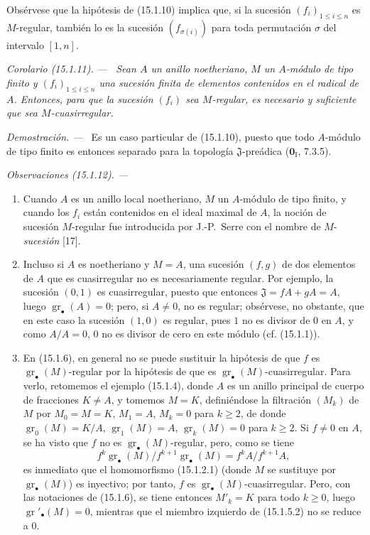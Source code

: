 \documentclass[10pt,oneside]{book}
\makeatletter
\newcommand{\gr}{\operatorname{gr}}
\newcommand{\setmanualcurrentlabel}[1]{\def\@currentlabel{#1}}
\newcommand{\oldpage}[2][]{%
  \setcounter{footnote}{0}%
  \marginpar{\scriptsize\textbf{#1}~|~#2}\ignorespaces}
\newenvironment{corollary}[1][]{%
  \setmanualcurrentlabel{#1}\par\medskip\noindent\itshape Corolario (#1). ---\ }{\par}
\newenvironment{remarks}[1][]{%
  \setmanualcurrentlabel{#1}\par\medskip\noindent\itshape Observaciones (#1). ---\ }{\par}
\newenvironment{proof}{%
  \par\medskip\noindent\textit{Demostración. ---\ }}{\par}
\makeatother
\begin{document}
Obsérvese que la hipótesis de (15.1.10) implica que, si la sucesión
$(f_i)_{1\leq i\leq n}$ es $M$-regular, también lo es la sucesión
$(f_{\sigma(i)})$ para toda permutación $\sigma$ del intervalo $[1,n]$.

\begin{corollary}[15.1.11]
\label{0.15.1.11-es}
Sean $A$ un anillo noetheriano, $M$ un $A$-módulo de tipo finito y
$(f_i)_{1\leq i\leq n}$ una sucesión finita de elementos contenidos en el
\textup{radical} de $A$. Entonces, para que la sucesión $(f_i)$ sea $M$-regular, es
necesario y suficiente que sea $M$-cuasirregular.
\end{corollary}

\begin{proof}
Es un caso particular de (15.1.10), puesto que todo $A$-módulo de tipo finito
es entonces separado para la topología $\mathfrak{J}$-preádica
($\mathbf{0}_{\mathrm I}$, 7.3.5).
\end{proof}

\begin{remarks}[15.1.12]
\label{0.15.1.12-es}
\mbox{}
\begin{enumerate}
  \item[(i)] Cuando $A$ es un anillo local noetheriano, $M$ un $A$-módulo de
  tipo finito, y cuando los $f_i$ están contenidos en el ideal maximal de $A$,
  la noción de sucesión $M$-regular fue introducida por J.-P.~Serre con el
  nombre de $M$-\emph{sucesión} [17].
  \item[(ii)] Incluso si $A$ es noetheriano y $M=A$, una sucesión $(f,g)$ de
  dos elementos de $A$ que es cuasirregular no es necesariamente regular. Por
  ejemplo, la sucesión $(0,1)$ es cuasirregular, puesto que entonces
  $\mathfrak{J}=fA+gA=A$, luego $\gr_\bullet(A)=0$; pero, si $A\neq0$, no es
  regular; obsérvese, no obstante, que en este caso la sucesión $(1,0)$ es
  regular, pues $1$ no es divisor de $0$ en $A$, y como $A/A=0$, $0$ no es
  divisor de cero en este módulo (cf. (15.1.1)).
  \item[(iii)]
  \oldpage[0\textsubscript{IV-1}]{17}
  En (15.1.6), en general no se puede sustituir la hipótesis de que $f$ es
  $\gr_\bullet(M)$-regular por la hipótesis de que es
  $\gr_\bullet(M)$-cuasirregular. Para verlo, retomemos el ejemplo (15.1.4),
  donde $A$ es un anillo principal de cuerpo de fracciones $K\neq A$, y
  tomemos $M=K$, definiéndose la filtración $(M_k)$ de $M$ por
  $M_0=M=K$, $M_1=A$, $M_k=0$ para $k\geq2$, de donde
  $\gr_0(M)=K/A$, $\gr_1(M)=A$, $\gr_k(M)=0$ para $k\geq2$. Si $f\neq0$ en
  $A$, se ha visto que $f$ no es $\gr_\bullet(M)$-regular, pero, como se tiene
  \[
    f^k\gr_\bullet(M)/f^{k+1}\gr_\bullet(M)=f^kA/f^{k+1}A,
  \]
  es inmediato que el homomorfismo (15.1.2.1) (donde $M$ se sustituye por
  $\gr_\bullet(M)$) es inyectivo; por tanto, $f$ es
  $\gr_\bullet(M)$-cuasirregular. Pero, con las notaciones de (15.1.6), se
  tiene entonces $M'_k=K$ para todo $k\geq0$, luego
  $\gr'_\bullet(M)=0$, mientras que el miembro izquierdo de (15.1.5.2) no se
  reduce a $0$.
\end{enumerate}
\end{remarks}
\end{document}
